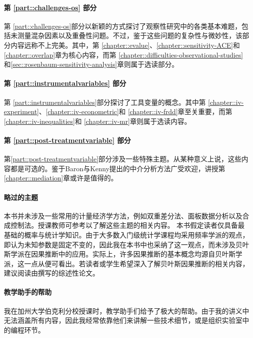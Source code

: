 \paragraph*{第 \ref{part::challenges-os} 部分}
第 \ref{part::challenges-os}部分以新颖的方式探讨了观察性研究中的各类基本难题，包括未测量混杂因素以及重叠性问题。不过，鉴于这些问题的复杂性与微妙性，该部分内容远称不上完美。其中，第 \ref{chapter::evalue}、\ref{chapter::sensitivity-ACE}和\ref{chapter::overlap}章为核心内容，而第 \ref{chapter::difficulties-observational-studies}和\ref{sec::rosenbaum-sensitivity-analysis}章则属于选读部分。 


\paragraph*{第 \ref{part::instrumentalvariables} 部分}
第 \ref{part::instrumentalvariables}部分探讨了工具变量的概念。其中第 \ref{chapter::iv-experiment}、\ref{chapter::iv-econometric}和 \ref{chapter::iv-frdd}章至关重要，而第 \ref{chapter::iv-inequalities}和 \ref{chapter::iv-mr}章则属于选读内容。


\paragraph*{第 \ref{part::post-treatmentvariable} 部分}
第\ref{part::post-treatmentvariable}部分涉及一些特殊主题。从某种意义上说，这些内容都是可选的。鉴于Baron与Kenny提出的中介分析方法广受欢迎，讲授第\ref{chapter::mediation}章或许是值得的。 


\paragraph*{ 略过的主题}
本书并未涉及一些常用的计量经济学方法，例如双重差分法、面板数据分析以及合成控制法。授课教师可参考\citet{angrist2008mostly}以了解这些主题的相关内容。
本书假定读者仅具备最基础的概率与统计学知识。由于大多数入门级统计学课程均采用频率学派的观点，即认为未知参数是固定不变的，因此我在本书中也采纳了这一观点，而未涉及贝叶斯学派在因果推断中的应用。实际上，许多因果推断的基本概念均源自贝叶斯学派，这一点从\citet{rubin1978bayesian}便可看出。若读者或学生希望深入了解贝叶斯因果推断的相关内容，建议阅读由\citet{li2023bayesian}撰写的综述性论文。 



\paragraph*{教学助手的帮助}  
我在加州大学伯克利分校授课时，教学助手们给予了极大的帮助。由于我的讲义中无法涵盖所有内容，因此我经常依靠他们来讲解一些技术细节，或是组织实验室中的编程环节。 
 


